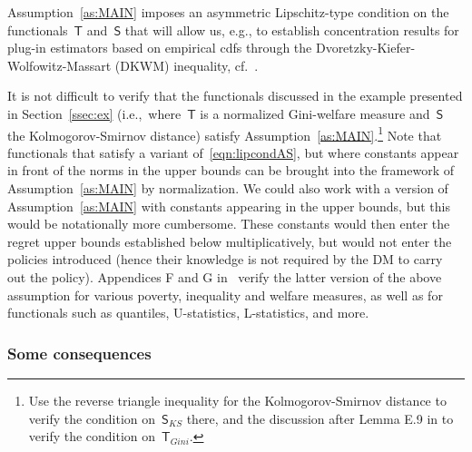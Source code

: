 \documentclass[11pt, a4paper]{article}
\theoremstyle{definition}
\begin{document}
Assumption~\ref{as:MAIN} imposes an asymmetric Lipschitz-type condition on the functionals~$\mathsf{T}$ and~$\mathsf{S}$ that will allow us, e.g., to establish concentration results for plug-in estimators based on empirical cdfs through the Dvoretzky-Kiefer-Wolfowitz-Massart (DKWM) inequality, cf.~\cite{massart1990}.

It is not difficult to verify that the functionals discussed in the example presented in Section~\ref{ssec:ex} (i.e.,~where~$\mathsf{T}$ is a normalized Gini-welfare measure and~$\mathsf{S}$ the Kolmogorov-Smirnov distance) satisfy Assumption~\ref{as:MAIN}.\footnote{Use the reverse triangle inequality for the Kolmogorov-Smirnov distance to verify the condition on~$\mathsf{S}_{KS}$ there, and the discussion after Lemma E.9 in \cite{kpv1} to verify the condition on~$\mathsf{T}_{Gini}$.} Note that functionals that satisfy a variant of~\eqref{eqn:lipcondAS}, but where constants appear in front of the norms in the upper bounds can be brought into the framework of Assumption~\ref{as:MAIN} by normalization. We could also work with a version of Assumption~\ref{as:MAIN} with constants appearing in the upper bounds, but this would be notationally more cumbersome. These constants would then enter the regret upper bounds established below multiplicatively, but would not enter the policies introduced (hence their knowledge is not required by the DM to carry out the policy). Appendices F and G in~\cite{kpv1} verify the latter version of the above assumption for various poverty, inequality and welfare measures, as well as for functionals such as quantiles, U-statistics, L-statistics, and more. 

\subsubsection{Some consequences}
\end{document}
